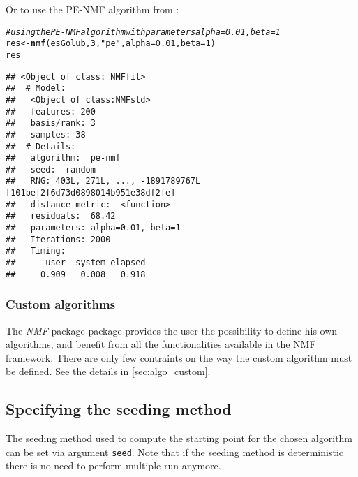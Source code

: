 \documentclass[a4paper]{article}\usepackage[]{graphicx}\usepackage[]{color}
\makeatletter
\newcommand{\hlnum}[1]{\textcolor[rgb]{0.686,0.059,0.569}{#1}}%
\newcommand{\hlstr}[1]{\textcolor[rgb]{0.192,0.494,0.8}{#1}}%
\newcommand{\hlcom}[1]{\textcolor[rgb]{0.678,0.584,0.686}{\textit{#1}}}%
\newcommand{\hlstd}[1]{\textcolor[rgb]{0.345,0.345,0.345}{#1}}%
\newcommand{\hlkwb}[1]{\textcolor[rgb]{0.69,0.353,0.396}{#1}}%
\newcommand{\hlkwc}[1]{\textcolor[rgb]{0.333,0.667,0.333}{#1}}%
\newcommand{\hlkwd}[1]{\textcolor[rgb]{0.737,0.353,0.396}{\textbf{#1}}}%
\newenvironment{kframe}{%
 \def\at@end@of@kframe{}%
 \ifinner\ifhmode%
  \def\at@end@of@kframe{\end{minipage}}%
  \begin{minipage}{\columnwidth}%
 \fi\fi%
 \def\FrameCommand##1{\hskip\@totalleftmargin \hskip-\fboxsep
 \colorbox{shadecolor}{##1}\hskip-\fboxsep
     \hskip-\linewidth \hskip-\@totalleftmargin \hskip\columnwidth}%
 \MakeFramed {\advance\hsize-\width
   \@totalleftmargin\z@ \linewidth\hsize
   \@setminipage}}%
 {\par\unskip\endMakeFramed%
 \at@end@of@kframe}
\newenvironment{knitrout}{}{} %
\let\code=\texttt
\newcommand{\pkgname}[1]{\textit{#1}\xspace}
\newcommand{\Rpkg}[1]{\pkgname{#1} package\xspace}
\newcommand{\nmfpack}{\Rpkg{NMF}}
\renewcommand{\cite}[1]{\parencite{#1}}
\makeatother
\begin{document}
Or to use the PE-NMF algorithm from \cite{Zhang2008}:
\begin{knitrout}
\color{fgcolor}\begin{kframe}
\begin{alltt}
\hlcom{# using the PE-NMF algorithm with parameters alpha=0.01, beta=1}
\hlstd{res} \hlkwb{<-} \hlkwd{nmf}\hlstd{(esGolub,} \hlnum{3}\hlstd{,} \hlstr{"pe"}\hlstd{,} \hlkwc{alpha} \hlstd{=} \hlnum{0.01}\hlstd{,} \hlkwc{beta} \hlstd{=} \hlnum{1}\hlstd{)}
\hlstd{res}
\end{alltt}
\begin{verbatim}
## <Object of class: NMFfit>
##  # Model:
##   <Object of class:NMFstd>
##   features: 200 
##   basis/rank: 3 
##   samples: 38 
##  # Details:
##   algorithm:  pe-nmf 
##   seed:  random 
##   RNG: 403L, 271L, ..., -1891789767L [101bef2f6d73d0898014b951e38df2fe]
##   distance metric:  <function> 
##   residuals:  68.42 
##   parameters: alpha=0.01, beta=1 
##   Iterations: 2000 
##   Timing:
##      user  system elapsed 
##     0.909   0.008   0.918
\end{verbatim}
\end{kframe}
\end{knitrout}


%
%
%


\subsubsection{Custom algorithms}
The \nmfpack package provides the user the possibility to define his own algorithms, and benefit from all the functionalities available in the NMF framework.
There are only few contraints on the way the custom algorithm must be defined.
See the details in \cref{sec:algo_custom}.

\subsection{Specifying the seeding method}\label{sec:seed}
The seeding method used to compute the starting point for the chosen algorithm can be set via argument \code{seed}. 
Note that if the seeding method is deterministic there is no need to perform multiple run anymore.
\end{document}
